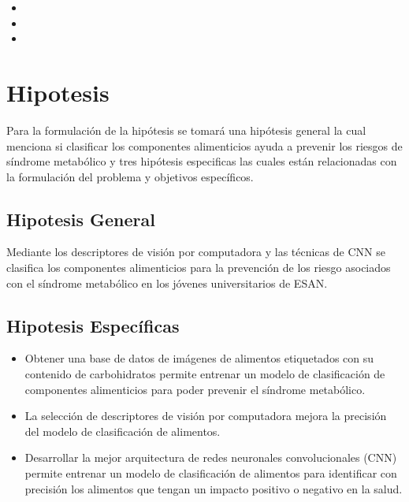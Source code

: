 \begin{itemize}
	\item {\Objone}
	\item {\Objtwo}
	\item {\Objthree}
\end{itemize}

\section{Hipotesis}

Para la formulación de la hipótesis se tomará una hipótesis general la cual menciona si clasificar los componentes alimenticios ayuda a prevenir los riesgos de síndrome metabólico y tres hipótesis especificas las cuales están relacionadas con la formulación del problema y objetivos específicos.

\subsection{Hipotesis General}
\newcommand{\HipotesisGeneral}{
Mediante los descriptores de visión por computadora y las técnicas de CNN se clasifica los componentes alimenticios para la prevención de los riesgo asociados con el síndrome metabólico en los jóvenes universitarios de ESAN.}
\HipotesisGeneral
\subsection{Hipotesis Específicas}
\newcommand{\Hone}{
	
 Obtener una base de datos de imágenes de alimentos etiquetados con su contenido de carbohidratos permite entrenar un modelo de clasificación de componentes alimenticios para poder prevenir el síndrome metabólico.
}
\newcommand{\Htwo}{

La selección de descriptores de visión por computadora mejora la precisión del modelo de clasificación de alimentos.
}
\newcommand{\Hthree}{
Desarrollar la mejor arquitectura de redes neuronales convolucionales (CNN) permite entrenar un modelo de clasificación de alimentos para identificar con precisión los alimentos que tengan un impacto positivo o negativo en la salud.	
}

\begin{itemize}
	\item \Hone
	\item \Htwo
	\item \Hthree
\end{itemize}

